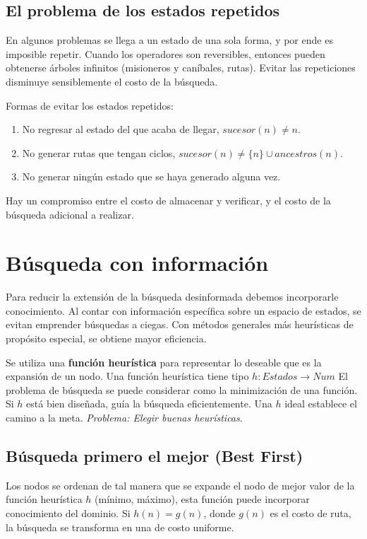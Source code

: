 \documentclass[a4paper,10pt]{paper}
\begin{document}
\subsection{El problema de los estados repetidos}
En algunos problemas se llega a un estado de una sola forma, y por ende
es imposible repetir. Cuando los operadores son reversibles, entonces
pueden obtenerse árboles infinitos (misioneros y caníbales, rutas). Evitar
las repeticiones disminuye sensiblemente el costo de la búsqueda.

Formas de evitar los estados repetidos:
\begin{enumerate}
    \item No regresar al estado del que acaba de llegar, $sucesor(n) \neq n$.
    \item No generar rutas que tengan ciclos, $sucesor(n) \neq \{n\}
        \cup ancestros(n)$.
    \item No generar ningún estado que se haya generado alguna vez.
\end{enumerate}
Hay un compromiso entre el costo de almacenar y verificar, y el costo de 
la búsqueda adicional a realizar.



\section{Búsqueda con información}
Para reducir la extensión de la búsqueda desinformada debemos incorporarle
conocimiento. Al contar con información específica sobre un espacio de estados,
se evitan emprender búsquedas a ciegas. Con métodos generales más heurísticas
de propósito especial, se obtiene mayor eficiencia.

Se utiliza una \textbf{función heurística} para representar lo deseable que es
la expansión de un nodo. Una función heurística tiene tipo $h : Estados \to Num$
El problema de búsqueda se puede considerar como la minimización de una función.
Si $h$ está bien diseñada, guía la búsqueda eficientemente. Una $h$ ideal
establece el camino a la meta. \textit{Problema: Elegir buenas heurísticas}.

\subsection{Búsqueda primero el mejor (Best First)}
Los nodos se ordenan de tal manera que se expande el nodo de mejor valor de la
función heurística $h$ (mínimo, máximo), esta función puede incorporar
conocimiento del dominio. Si $h(n) = g(n)$, donde $g(n)$ es el costo de ruta,
la búsqueda se transforma en una de costo uniforme.
\end{document}
